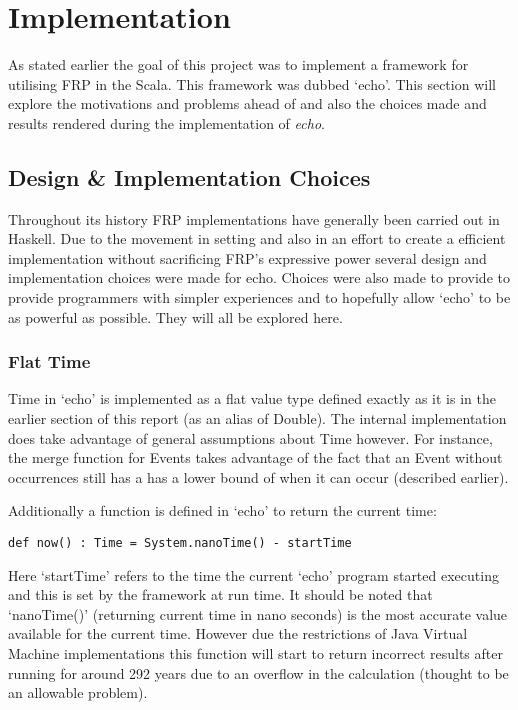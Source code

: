\chapter{Implementation}
  As stated earlier the goal of this project was to implement a framework for utilising FRP in the Scala. 
  This framework was dubbed `echo'. This section will explore the motivations and problems ahead of
  and also the choices made and results rendered during the implementation of \emph{echo}.
  
  \section{Design \& Implementation Choices}
  Throughout its history FRP implementations have generally been carried out in Haskell. Due to the movement
  in setting and also in an effort to create a efficient implementation without sacrificing FRP's expressive power
  several design and implementation choices were made for echo. Choices were also made
  to provide to provide programmers with simpler experiences and to hopefully allow `echo' to be
  as powerful as possible. They will all be explored here.
  
    \subsection{Flat Time}
      Time in `echo' is implemented as a flat value type defined exactly as it is in the earlier
      section of this report (as an alias of Double). The internal implementation does take advantage
      of general assumptions about Time however. For instance, the merge function for Events takes advantage
      of the fact that an Event without occurrences still has a has a lower bound of when it can occur (described
      earlier). 
      
      Additionally a function is defined in `echo' to return the current time:
      
\begin{verbatim}
def now() : Time = System.nanoTime() - startTime
\end{verbatim}      

      Here `startTime' refers to the time the current `echo' program started executing and this is
      set by the framework at run time. It should be noted that `nanoTime()' (returning current time in
      nano seconds) is the most accurate value available for the current time. However due the restrictions
      of Java Virtual Machine implementations this function will start to return incorrect results 
      after running for around 292 years due to an overflow in the calculation (thought to be an allowable
      problem).
      

